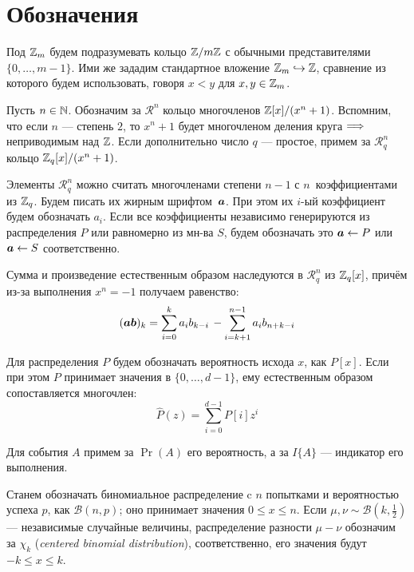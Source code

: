 \section{Обозначения}
\label{sec:Chapter1} 

Под $\Z_m$ будем подразумевать кольцо $\Z/m\Z$ с обычными представителями $\{0, \ldots, m-1\}$. Ими же зададим стандартное вложение $\Z_m \hookrightarrow \Z$, сравнение из которого будем использовать, говоря $x < y$ для $x, y \in \Z_m$.

Пусть $n \in \N$. Обозначим за $\mathcal{R}^n$ кольцо многочленов $\Z[x]/(x^n+1)$. Вспомним, что если $n$ --- степень $2$, то $x^n+1$ будет многочленом деления круга $\reqv$ неприводимым над $\Z$. Если дополнительно число $q$ --- простое, примем за $\mathcal{R}_q^n$ кольцо $\Z_q[x]/(x^n+1)$.

Элементы $\mathcal{R}_q^n$ можно считать многочленами степени $n-1$ с $n$~коэффициентами из $\Z_q$. Будем писать их жирным шрифтом~$\bold a$. При этом их $i$-ый коэффициент будем обозначать $a_i$. Если все коэффициенты независимо генерируются из распределения $P$ или равномерно из мн-ва $S$, будем обозначать это $\bold{a} \leftarrow P$ или $\bold{a} \leftarrow S$ соответственно.

Сумма и произведение естественным образом наследуются в $\mathcal{R}_q^n$ из $\Z_q[x]$, причём из-за выполнения $x^n = -1$ получаем равенство:
\begin{equation}
	(\bold a\bold b)_k = \sum_{i=0}^k{a_ib_{k-i}}\,-\sum_{i=k+1}^{n-1}{a_ib_{n+k-i}}
\end{equation}

Для распределения $P$ будем обозначать вероятность исхода $x$, как $P[x]$. Если при этом $P$ принимает значения в $\{0, \ldots, d-1\}$, ему естественным образом сопоставляется многочлен:
\begin{equation}
	\hat P(z) = \sum_{i=0}^{d-1}{P[i]z^i}
\end{equation}

Для события $A$ примем за $\Pr(A)$ его вероятность, а за $I\{A\}$ --- индикатор его выполнения.

Станем обозначать биномиальное распределение c $n$ попытками и вероятностью успеха $p$, как $\mathcal{B}(n, p)$; оно принимает значения $0 \leq x \leq n$. Если $\mu, \nu \sim \mathcal{B}(k, \frac12)$ --- независимые случайные величины, распределение разности $\mu-\nu$ обозначим за $\chi_k$ ({\it centered binomial distribution}), соответственно, его значения будут $-k \leq x \leq k$.

